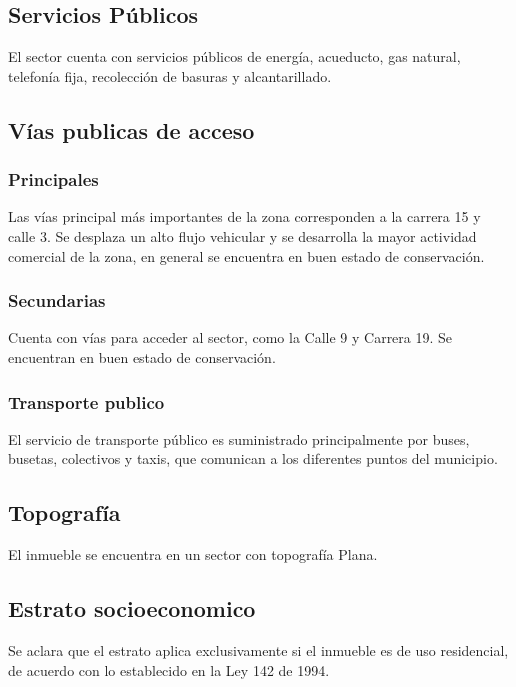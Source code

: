 \documentclass[12pt,a4paper,twoside]{article}
\begin{document}
\subsection{Servicios Públicos}

El sector cuenta con servicios públicos de energía, acueducto, gas natural, telefonía fija, recolección de basuras y alcantarillado.

\subsection{Vías publicas de acceso}

\subsubsection{Principales}

Las vías principal más importantes de la zona corresponden a la carrera 15 y calle 3.  Se desplaza un alto flujo vehicular y se desarrolla la mayor actividad comercial de la zona, en general se encuentra en buen estado de conservación.	

\subsubsection{Secundarias}

 Cuenta con vías para acceder al sector, como  la  Calle 9 y Carrera 19. Se encuentran en buen estado de conservación.

\subsubsection{Transporte publico}

El servicio de transporte público es suministrado principalmente por  buses, busetas, colectivos y taxis, que comunican a los diferentes puntos del municipio.

\subsection{Topografía}

El inmueble se encuentra en un sector con topografía Plana.%

\subsection{Estrato socioeconomico}

 Se aclara que el estrato aplica exclusivamente si el inmueble es de uso residencial, de acuerdo con lo establecido en la Ley 142 de 1994.
\end{document}
